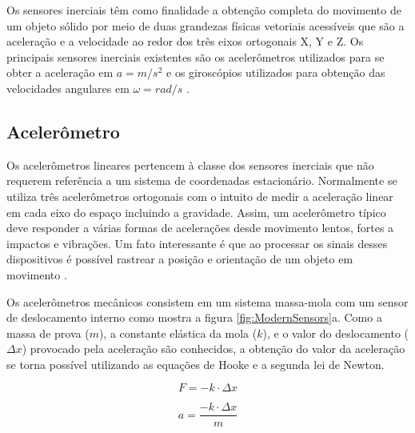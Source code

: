 Os sensores inerciais têm como finalidade a obtenção completa do movimento de um objeto sólido por meio de duas grandezas físicas vetoriais acessíveis que são a aceleração e a velocidade ao redor dos três eixos ortogonais X, Y e Z. Os principais sensores inerciais existentes são os acelerômetros utilizados para se obter a aceleração em $a  = m/s^2$ e os giroscópios utilizados para obtenção das velocidades angulares em $\omega= rad/s $ \cite[p.~527]{Korvink2006}.









\newpage
\subsection{Acelerômetro}


Os acelerômetros lineares pertencem à classe dos sensores inerciais que não requerem
referência a um sistema de coordenadas estacionário. Normalmente se utiliza três acelerômetros ortogonais com o intuito de medir a aceleração linear em cada eixo do espaço incluindo a gravidade. Assim, um acelerômetro típico deve responder a várias formas de acelerações desde movimento lentos, fortes a impactos e vibrações. Um fato interessante é que ao processar os sinais desses dispositivos é possível rastrear a posição e orientação de um objeto em movimento \cite{ModernSensors}.

 Os acelerômetros mecânicos consistem em um sistema massa-mola com um sensor de deslocamento interno como mostra a figura \ref{fig:ModernSensors}a. Como a massa de prova ($m$), a constante elástica da mola ($k$), e o valor do deslocamento ($\Delta x$)  provocado pela aceleração são conhecidos, a obtenção do valor da aceleração se torna possível utilizando as equações de Hooke e a segunda lei de Newton.


\begin{equation}
    F = -k\cdot\Delta x
\end{equation}


\begin{equation}
    a =\frac{-k\cdot\Delta x}{m}
\end{equation}


